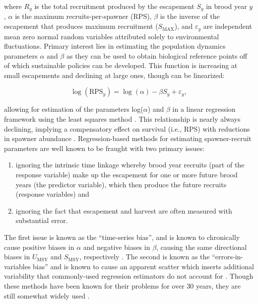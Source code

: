 \documentclass[12pt,]{book}
\theoremstyle{definition}
\theoremstyle{definition}
\theoremstyle{definition}
\theoremstyle{remark}
\begin{document}
\noindent
where \(R_y\) is the total recruitment produced by the escapement
\(S_y\) in brood year \(y\), \(\alpha\) is the maximum
recruits-per-spawner (RPS), \(\beta\) is the inverse of the escapement
that produces maximum recruitment (\(S_{\text{MAX}}\)), and
\(\varepsilon_y\) are independent mean zero normal random variables
attributed solely to environmental fluctuations. Primary interest lies
in estimating the population dynamics parameters \(\alpha\) and
\(\beta\) as they can be used to obtain biological reference points off
of which sustainable policies can be developed. This function is
increasing at small escapements and declining at large ones, though can
be linearized:

\begin{equation}
  \log(\text{RPS}_y)=\log(\alpha)-\beta S_y + \varepsilon_y,
  \label{eq:lin-ricker-fixed}
\end{equation}

\noindent
allowing for estimation of the parameters log(\(\alpha\)) and \(\beta\)
in a linear regression framework using the least squares method
\citep{clark-etal-2009}. This relationship is nearly always declining,
implying a compensatory effect on survival (i.e., RPS) with reductions
in spawner abundance \citep{rose-etal-2001}. Regression-based methods
for estimating spawner-recruit parameters are well known to be fraught
with two primary issues:

\begin{enumerate}
\def\labelenumi{(\arabic{enumi})}
\item
  ignoring the intrinsic time linkage whereby brood year recruits (part
  of the response variable) make up the escapement for one or more
  future brood years (the predictor variable), which then produce the
  future recruits (response variables) and
\item
  ignoring the fact that escapement and harvest are often measured with
  substantial error.
\end{enumerate}

\noindent
The first issue is known as the ``time-series bias'', and is known to
chronically cause positive biases in \(\alpha\) and negative biases in
\(\beta\), causing the same directional biases in \(U_{\text{MSY}}\) and
\(S_{\text{MSY}}\), respectively \citep[i.e., spuriously providing too
aggressive harvest policy recommendations;][]{walters-1985}. The second
is known as the ``errors-in-variables bias'' and is known to cause an
apparent scatter which inserts additional variability that commonly-used
regression estimators do not account for \citep{ludwig-walters-1981}.
Though these methods have been known for their problems for over 30
years, they are still somewhat widely used \citep{korman-english-2013}.
\end{document}
